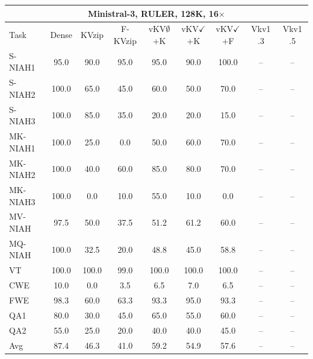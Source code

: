 \begin{tabular}{lcccccccc}
\toprule
\multicolumn{9}{c}{Ministral-3, RULER, 128K, 16$\times$} \\
\midrule
Task & Dense & KVzip & F-KVzip & vKV$\emptyset$+K & vKV$\checkmark$+K & vKV$\checkmark$+F & Vkv1 .3 & Vkv1 .5 \\
\midrule
S-NIAH1 & 95.0 & 90.0 & 95.0 & 95.0 & 90.0 & 100.0 & -- & -- \\
S-NIAH2 & 100.0 & 65.0 & 45.0 & 60.0 & 50.0 & 70.0 & -- & -- \\
S-NIAH3 & 100.0 & 85.0 & 35.0 & 20.0 & 20.0 & 15.0 & -- & -- \\
MK-NIAH1 & 100.0 & 25.0 & 0.0 & 50.0 & 60.0 & 70.0 & -- & -- \\
MK-NIAH2 & 100.0 & 40.0 & 60.0 & 85.0 & 80.0 & 70.0 & -- & -- \\
MK-NIAH3 & 100.0 & 0.0 & 10.0 & 55.0 & 10.0 & 0.0 & -- & -- \\
MV-NIAH & 97.5 & 50.0 & 37.5 & 51.2 & 61.2 & 60.0 & -- & -- \\
MQ-NIAH & 100.0 & 32.5 & 20.0 & 48.8 & 45.0 & 58.8 & -- & -- \\
VT & 100.0 & 100.0 & 99.0 & 100.0 & 100.0 & 100.0 & -- & -- \\
CWE & 10.0 & 0.0 & 3.5 & 6.5 & 7.0 & 6.5 & -- & -- \\
FWE & 98.3 & 60.0 & 63.3 & 93.3 & 95.0 & 93.3 & -- & -- \\
QA1 & 80.0 & 30.0 & 45.0 & 65.0 & 55.0 & 60.0 & -- & -- \\
QA2 & 55.0 & 25.0 & 20.0 & 40.0 & 40.0 & 45.0 & -- & -- \\
\midrule
Avg & 87.4 & 46.3 & 41.0 & 59.2 & 54.9 & 57.6 & -- & -- \\
\bottomrule
\end{tabular}
\vspace{0.8em}

